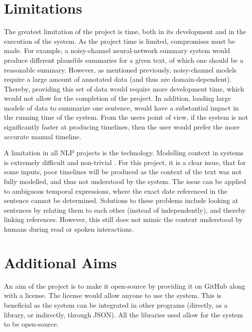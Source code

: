 \section{Limitations}
\par The greatest limitation of the project is time, both in its development and in the execution of the system. As the project time is limited, compromises must be made. For example, a noisy-channel neural-network summary system would produce different plausible summaries for a given text, of which one should be a reasonable summary. However, as mentioned previously, noisy-channel models require a large amount of annotated data (and thus are domain-dependent). Thereby, providing this set of data would require more development time, which would not allow for the completion of the project. In addition, loading large models of data to summarize one sentence, would have a substantial impact in the running time of the system. From the users point of view, if the system is not significantly faster at producing timelines, then the user would prefer the more accurate manual timeline.

\par A limitation in all NLP projects is the technology. Modelling context in systems is extremely difficult and non-trivial \cite{iwanskazadrozny1997}. For this project, it is a clear issue, that for some inputs, poor timelines will be produced as the context of the text was not fully modelled, and thus not understood by the system. The issue can be applied to ambiguous temporal expressions, where the exact date referenced in the sentence cannot be determined. Solutions to these problems include looking at sentences by relating them to each other (instead of independently), and thereby linking references. However, this still does not mimic the context understood by humans during read or spoken interactions.

\section{Additional Aims} 
\par An aim of the project is to make it open-source by providing it on GitHub along with a license. The license would allow anyone to use the system. This is beneficial as the system can be integrated in other programs (directly, as a library, or indirectly, through JSON). All the libraries used allow for the system to be open-source.

